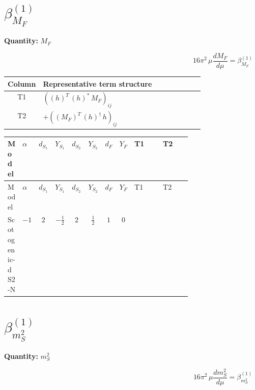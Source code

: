 \documentclass[8pt]{article}
\begin{document}
\begin{landscape}
\section*{$\beta_{M_F}^{(1)}$}
\noindent\textbf{Quantity: }$M_F$\par\smallskip
\[16\pi^2\,\mu\frac{d M_F}{d\mu}=\beta_{M_F}^{(1)}\]
\begin{center}
\begin{tabular}{@{}c >{\raggedright\arraybackslash}p{0.82\linewidth}@{}}
\toprule
Column & Representative term structure \\
\midrule
T1 & \(\displaystyle \left(\left({h}\right)^{T}\,\left({h}\right)^{*}\,{M_F}\right)_{ij}\) \\
\midrule
T2 & \(\displaystyle +\left(\left({M_F}\right)^{T}\,\left({h}\right)^{\dagger}\,{h}\right)_{ij}\) \\
\midrule
\bottomrule
\end{tabular}
\end{center}
\smallskip
\tiny
\begin{longtable}{@{}llcccccc >{\raggedright\arraybackslash}p{0.21\linewidth} >{\raggedright\arraybackslash}p{0.21\linewidth}@{}}
\toprule
Model & $\alpha$ & $d_{S_1}$ & $Y_{S_1}$ & $d_{S_2}$ & $Y_{S_2}$ & $d_F$ & $Y_F$ & T1 & T2 \\
\midrule
\endfirsthead
\toprule
Model & $\alpha$ & $d_{S_1}$ & $Y_{S_1}$ & $d_{S_2}$ & $Y_{S_2}$ & $d_F$ & $Y_F$ & T1 & T2 \\
\midrule
\endhead
Scotogenic-dS2-N & $-1$ & $2$ & $-\frac{1}{2}$ & $2$ & $\frac{1}{2}$ & $1$ & $0$ & \scriptsize\adjustbox{max width=\linewidth}{$\begin{gathered} \left(\left({h}\right)^{T}\,\left({h}\right)^{*}\,{M_F}\right)_{ij}\end{gathered}$} & \scriptsize\adjustbox{max width=\linewidth}{$\begin{gathered} +\left(\left({M_F}\right)^{T}\,\left({h}\right)^{\dagger}\,{h}\right)_{ij}\end{gathered}$} \\
\midrule
\bottomrule
\end{longtable}
\clearpage
\section*{$\beta_{m_S^2}^{(1)}$}
\noindent\textbf{Quantity: }$m_S^2$\par\smallskip
\[16\pi^2\,\mu\frac{d m_S^2}{d\mu}=\beta_{m_S^2}^{(1)}\]

\end{landscape}
\end{document}
